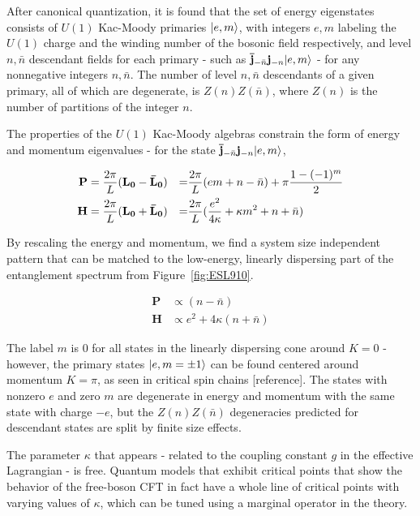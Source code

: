 After canonical quantization, it is found that the set of energy
eigenstates consists of $U(1)$ Kac-Moody primaries $\vert e, m \rangle$, with
integers $e, m$ labeling the $U(1)$ charge and the winding number of
the bosonic field respectively, and level $n, \bar{n}$ descendant
fields for each primary - such as  $\mathbf{\bar{j}}_{-\bar{n}}
\mathbf{j}_{-n} \vert e, m \rangle$ - for any nonnegative integers $n,
\bar{n}$. The number of level $n, \bar{n}$ descendants of a given
primary, all of which are degenerate, is $Z(n) Z(\bar{n})$, where
$Z(n)$ is the number of partitions of the integer $n$.

The properties of the $U(1)$ Kac-Moody algebras constrain the form of
energy and momentum eigenvalues - for the state
$\mathbf{\bar{j}}_{-\bar{n}} \mathbf{j}_{-n} \vert e, m \rangle$,

\begin{align*}
	\mathbf{P} =\frac{2\pi}{L}&(\uL-\bL)
	&=& \frac{2\pi}{L}(em + n - \bar{n})+\pi\frac{1-(-1)^m}{2} \\
	\mathbf{H} = \frac{2\pi}{L}&(\uL+\bL)
	&=& \frac{2\pi}{L}(\frac{e^2}{4\kappa} + \kappa m^2 + n + \bar{n}) %
\end{align*}

By rescaling the energy and momentum, we find a system size
independent pattern that can be matched to the low-energy, linearly
dispersing part of the entanglement spectrum from Figure~\ref{fig:ESL910}.

\begin{align*}
\mathbf{P} &\propto (n - \bar{n}) \\
\mathbf{H} &\propto e^2 + 4\kappa(n + \bar{n})
\end{align*}

The label $m$ is 0 for all states in the linearly dispersing cone
around $K=0$ - however, the primary states $\vert e, m=\pm 1 \rangle$ can be
found centered around momentum $K=\pi$, as seen in critical spin
chains [reference]. The states with nonzero $e$ and zero $m$ are
degenerate in energy and momentum with the same state with charge
$-e$, but the $Z(n)Z(\bar{n})$ degeneracies predicted for descendant
states are split by finite size effects.

The parameter $\kappa$ that appears - related to the coupling constant
$g$ in the effective Lagrangian - is free. Quantum models that exhibit
critical points that show the behavior of the free-boson CFT in fact
have a whole line of critical points with varying values of $\kappa$,
which can be tuned using a marginal operator in the theory.

